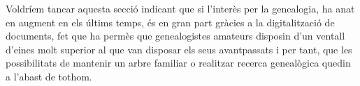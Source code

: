     Voldríem tancar aquesta secció indicant que si l'interès per la genealogia, ha anat en augment en els últims temps, és en gran part gràcies a la digitalització de documents, fet que ha permès que genealogistes amateurs disposin d’un ventall d’eines molt superior al que van disposar els seus avantpassats i per tant, que les possibilitats de mantenir un arbre familiar o realitzar recerca genealògica quedin a l'abast de tothom.
